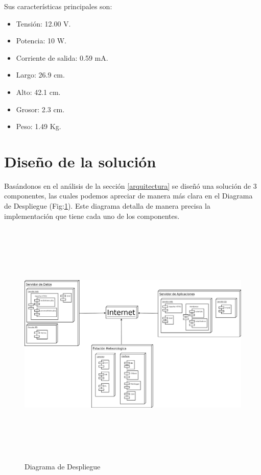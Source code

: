 Sus características principales son:\\

\begin{itemize}
\item Tensión: 12.00 V.
\item Potencia: 10 W.
\item Corriente de salida: 0.59 mA.
\item Largo: 26.9 cm.
\item Alto: 42.1 cm.
\item Grosor: 2.3 cm.
\item Peso: 1.49 Kg.
\end{itemize}

\newpage
\section{Diseño de la solución}
Basándonos en el análisis de la sección \ref{arquitectura} se diseñó una solución de 3 componentes, las cuales podemos apreciar de manera más clara en el Diagrama de Despliegue (Fig:\ref{diagramaDespliegue}). Este diagrama detalla de manera precisa la implementación que tiene cada uno de los componentes.\\

\begin{figure}[h!]
        \centering
        \includegraphics[width=15cm,height=12cm]{images/despliegue}
        \caption{Diagrama de Despliegue}
	\label{diagramaDespliegue}
\end{figure}

